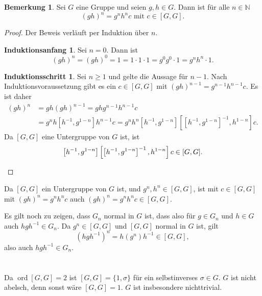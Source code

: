 \documentclass[a4paper,10pt]{article}
\theoremstyle{definition}
\newtheorem{bem}[beh]{Bemerkung}
\newtheorem*{ia}{Induktionsanfang}
\newtheorem*{is}{Induktionsschritt}
\newcommand{\N}{\mathbb{N}}
\newcommand{\ord}{\operatorname{ord}}
\begin{document}
\begin{bem}
 Sei $G$ eine Gruppe und seien $g,h \in G$. Dann ist für alle $n \in \N$
 \[
  (gh)^n = g^n h^n c \text{ mit } c \in [G,G].
 \]
\end{bem}
\begin{proof}
 Der Beweis verläuft per Induktion über $n$.
 \begin{ia}
  Sei $n=0$. Dann ist
  \[
   (gh)^n = (gh)^0 = 1 = 1 \cdot 1 \cdot 1 = g^0 g^0 \cdot 1 = g^n h^n \cdot 1.
  \]
 \end{ia}
 \begin{is}
  Sei $n \geq 1$ und gelte die Aussage für $n-1$. Nach Induktionsvoraussetzung gibt es ein $c \in [G,G]$ mit $(gh)^{n-1} = g^{n-1} h^{n-1} c$. Es ist daher
  \begin{align*}
   (gh)^n
   &= gh (gh)^{n-1}
   = gh g^{n-1} h^{n-1} c \\
   &= g^n h \left[h^{-1},g^{1-n}\right] h^{n-1} c
   = g^n h^n \left[h^{-1},g^{1-n}\right] \left[\left[h^{-1},g^{1-n}\right]^{-1}, h^{1-n}\right] c.
  \end{align*}
  Da $[G,G]$ eine Untergruppe von $G$ ist, ist
  \[
   \left[h^{-1},g^{1-n}\right] \left[\left[h^{-1},g^{1-n}\right]^{-1}, h^{1-n}\right] c \in [G,G]. \qedhere
  \]
 \end{is}
\end{proof}

Da $[G,G]$ ein Untergruppe von $G$ ist, und $g^n, h^n \in [G,G]$, ist mit $c \in [G,G]$ mit $(gh)^n = g^n h^n c$ auch $(gh)^n = g^n h^n c \in [G,G]$.

Es gilt noch zu zeigen, dass $G_n$ normal in $G$ ist, dass also für $g \in G_n$ und $h \in G$ auch $hgh^{-1} \in G_n$. Da $g^n \in [G,G]$ und $[G,G]$ normal in $G$ ist, gilt
\[
 (hgh^{-1})^n = h(g^n)h^{-1} \in [G,G],
\]
also auch $hgh^{-1} \in G_n$.







\section{}
Da $\ord [G,G] = 2$ ist $[G,G] = \{1, \sigma\}$ für ein selbstinverses $\sigma \in G$. $G$ ist nicht abelsch, denn sonst wäre $[G,G] = 1$. $G$ ist insbesondere nichttrivial.
\end{document}
